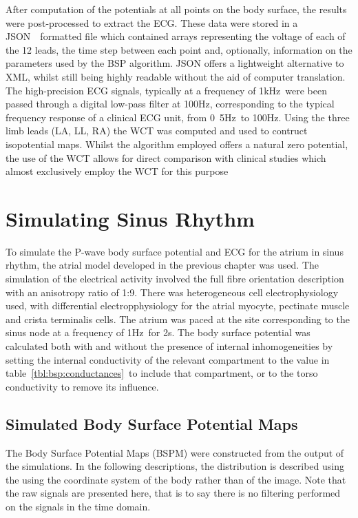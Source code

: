 After computation of the potentials at all points on the body surface, the
results were post-processed to extract the ECG.
These data were stored in a JSON~\cite{json}\ formatted file which contained
arrays representing the voltage of each of the 12 leads, the time step between
each point and, optionally, information on the parameters used by the BSP
algorithm.
JSON offers a lightweight alternative to XML, whilst still being highly readable
without the aid of computer translation.
The high-precision ECG signals, typically at a frequency of \unit{1}{kHz}\
were been passed through a digital low-pass filter at \unit{100}{Hz},
corresponding to the typical frequency response of a clinical ECG unit, from
\unit{0.5}{Hz}\ to \unit{100}{Hz}.
Using the three limb leads (LA, LL, RA) the WCT was computed and used to
contruct isopotential maps.
Whilst the algorithm employed offers a natural zero potential, the use of the
WCT allows for direct comparison with clinical studies which almost exclusively
employ the WCT for this purpose~\cite{Taccardi1966,Mirvis1980}


\section{Simulating Sinus Rhythm}

To simulate the P-wave body surface potential and ECG for the atrium in sinus
rhythm, the atrial model developed in the previous chapter was used.
The simulation of the electrical activity involved the full fibre orientation
description with an anisotropy ratio of 1:9.
There was heterogeneous cell electrophysiology used, with differential
electropphysiology for the atrial myocyte, pectinate muscle and crista
terminalis cells.
The atrium was paced at the site corresponding to the sinus node at a frequency
of \unit{1}{Hz}\ for \unit{2}{s}.
The body surface potential was calculated both with and without the presence of
internal inhomogeneities by setting the internal conductivity of the relevant
compartment to the value in table~\ref{tbl:bsp:conductances}\ to include that
compartment, or to the torso conductivity to remove its influence.

\subsection{Simulated Body Surface Potential Maps}

The Body Surface Potential Maps (BSPM) were constructed from the output of the
simulations.
In the following descriptions, the distribution is described using the using the
coordinate system of the body rather than of the image.
Note that the raw signals are presented here, that is to say there is no
filtering performed on the signals in the time domain.

